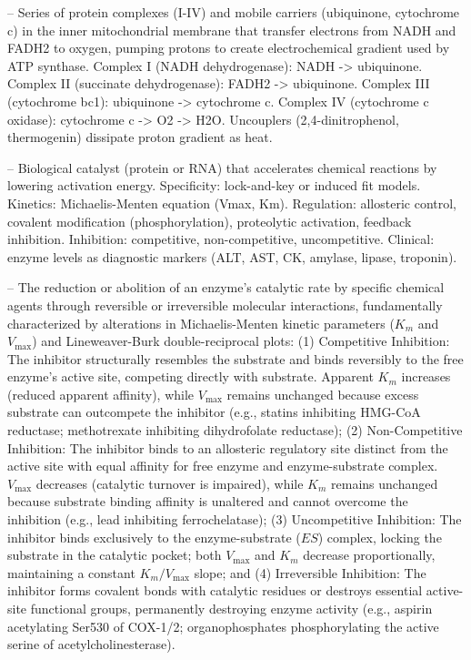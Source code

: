 -- Series of protein complexes (I-IV) and mobile carriers (ubiquinone, cytochrome c) in the inner mitochondrial membrane that transfer electrons from NADH and FADH2 to oxygen, pumping protons to create electrochemical gradient used by ATP synthase. Complex I (NADH dehydrogenase): NADH -> ubiquinone. Complex II (succinate dehydrogenase): FADH2 -> ubiquinone. Complex III (cytochrome bc1): ubiquinone -> cytochrome c. Complex IV (cytochrome c oxidase): cytochrome c -> O2 -> H2O. Uncouplers (2,4-dinitrophenol, thermogenin) dissipate proton gradient as heat.

-- Biological catalyst (protein or RNA) that accelerates chemical reactions by lowering activation energy. Specificity: lock-and-key or induced fit models. Kinetics: Michaelis-Menten equation (Vmax, Km). Regulation: allosteric control, covalent modification (phosphorylation), proteolytic activation, feedback inhibition. Inhibition: competitive, non-competitive, uncompetitive. Clinical: enzyme levels as diagnostic markers (ALT, AST, CK, amylase, lipase, troponin).

-- The reduction or abolition of an enzyme's catalytic rate by specific chemical agents through reversible or irreversible molecular interactions, fundamentally characterized by alterations in Michaelis-Menten kinetic parameters ($K_m$ and $V_{\max}$) and Lineweaver-Burk double-reciprocal plots: (1) Competitive Inhibition: The inhibitor structurally resembles the substrate and binds reversibly to the free enzyme's active site, competing directly with substrate. Apparent $K_m$ increases (reduced apparent affinity), while $V_{\max}$ remains unchanged because excess substrate can outcompete the inhibitor (e.g., statins inhibiting HMG-CoA reductase; methotrexate inhibiting dihydrofolate reductase); (2) Non-Competitive Inhibition: The inhibitor binds to an allosteric regulatory site distinct from the active site with equal affinity for free enzyme and enzyme-substrate complex. $V_{\max}$ decreases (catalytic turnover is impaired), while $K_m$ remains unchanged because substrate binding affinity is unaltered and cannot overcome the inhibition (e.g., lead inhibiting ferrochelatase); (3) Uncompetitive Inhibition: The inhibitor binds exclusively to the enzyme-substrate ($ES$) complex, locking the substrate in the catalytic pocket; both $V_{\max}$ and $K_m$ decrease proportionally, maintaining a constant $K_m/V_{\max}$ slope; and (4) Irreversible Inhibition: The inhibitor forms covalent bonds with catalytic residues or destroys essential active-site functional groups, permanently destroying enzyme activity (e.g., aspirin acetylating Ser530 of COX-1/2; organophosphates phosphorylating the active serine of acetylcholinesterase).

